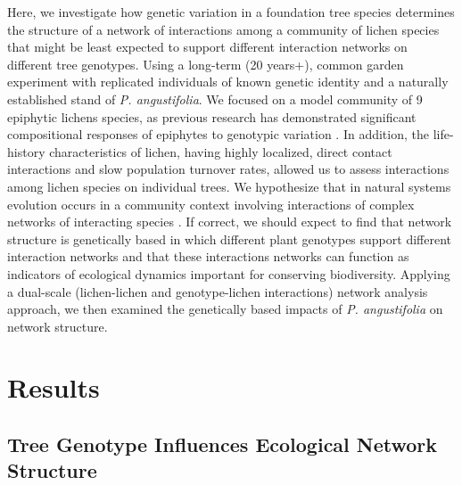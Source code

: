 \documentclass[fleqn,10pt]{wlscirep}
\begin{document}
Here, we investigate how genetic variation in a foundation tree
species determines the structure of a network of interactions among a
community of lichen species that might be least expected to support
different interaction networks on different tree genotypes. Using a
long-term (20 years+), common garden experiment with replicated
individuals of known genetic identity and a naturally established
stand of \textit{P. angustifolia}. We focused on a model community of
9 epiphytic lichens species, as previous research has demonstrated
significant compositional responses of epiphytes to genotypic
variation \cite{Winfree2011, Zytynska2011}. In addition, the
life-history characteristics of lichen, having highly localized,
direct contact interactions and slow population turnover rates,
allowed us to assess interactions among lichen species on individual
trees. We hypothesize that in natural systems evolution occurs in a
community context involving interactions of complex networks of
interacting species \cite{Keith et al. 2017, Thompson2013,
  Bascompte2007, Darwin1855}.  If correct, we should expect to find
that network structure is genetically based in which different plant
genotypes support different interaction networks and that these
interactions networks can function as indicators of ecological
dynamics important for conserving biodiversity.  Applying a dual-scale
(lichen-lichen and genotype-lichen interactions) network analysis
approach, we then examined the genetically based impacts of
\textit{P. angustifolia} on network structure. 


\section*{Results}


\subsection*{Tree Genotype Influences Ecological Network Structure}
\end{document}
